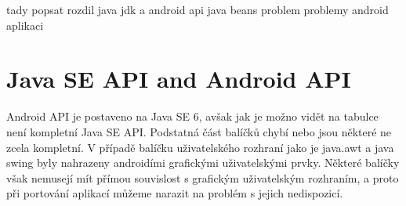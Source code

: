 tady popsat rozdil java jdk a android api
java beans problem
problemy android aplikaci


\section{Java SE API and Android API}\label{apis}
Android API je postaveno na Java SE 6, avšak jak je možno vidět na tabulce  není kompletní Java SE API. Podstatná část balíčků chybí nebo jsou některé ne zcela kompletní. V případě balíčku uživatelského rozhraní jako je java.awt a java swing byly nahrazeny androidími grafickými uživatelskými prvky. Některé balíčky však nemusejí mít přímou souvislost s grafickým uživatelským rozhraním, a proto při portování aplikací můžeme narazit na problém s jejich nedispozicí.

